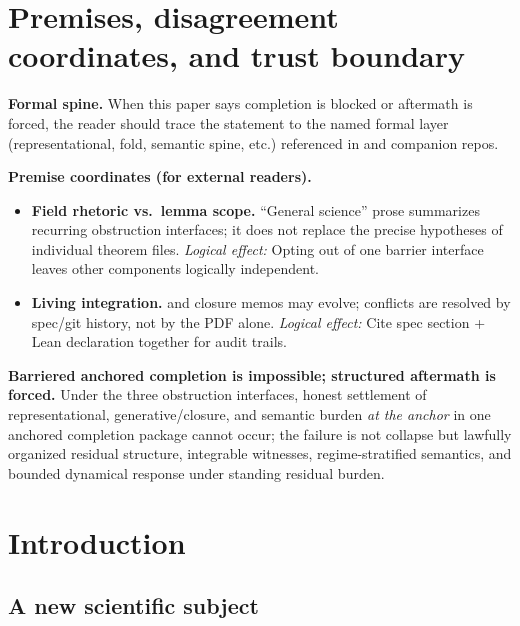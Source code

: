 \documentclass[11pt]{article}
\theoremstyle{plain}
\theoremstyle{definition}
\theoremstyle{remark}
\begin{document}
\section{Premises, disagreement coordinates, and trust boundary}\label{sec:premises-gsrs}
\begin{keybox}[title=Where disagreement can (and cannot) live]
\textbf{Formal spine.}
When this paper says completion is blocked or aftermath is forced, the reader should trace the statement to the named formal layer (representational, fold, semantic spine, etc.) referenced in  and companion repos.

\medskip
\textbf{Premise coordinates (for external readers).}
\begin{itemize}[leftmargin=2em]
\item \textbf{Field rhetoric vs.\ lemma scope.} ``General science'' prose summarizes recurring obstruction interfaces; it does not replace the precise hypotheses of individual theorem files.
  \emph{Logical effect:} Opting out of one barrier interface leaves other components logically independent.
\item \textbf{Living integration.}  and closure memos may evolve; conflicts are resolved by spec/git history, not by the PDF alone.
  \emph{Logical effect:} Cite spec section + Lean declaration together for audit trails.
\end{itemize}
\end{keybox}

\begin{keybox}[title=Master law of reflexive systems]
\textbf{Barriered anchored completion is impossible; structured aftermath is forced.} Under the three obstruction interfaces, honest settlement of representational, generative/closure, and semantic burden \emph{at the anchor} in one anchored completion package cannot occur; the failure is not collapse but lawfully organized residual structure, integrable witnesses, regime-stratified semantics, and bounded dynamical response under standing residual burden.
\end{keybox}

\section{Introduction}

\subsection{A new scientific subject}
\end{document}
